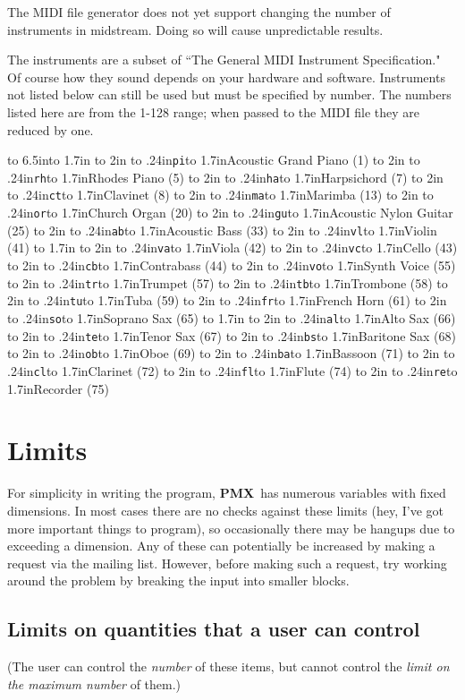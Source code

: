\documentclass[11pt]{article}
\newcommand\PMXX{\textbf{PMX}}
\newcommand\PMX{\PMXX~}
\begin{document}
The MIDI file generator does not yet support changing the number of 
instruments in midstream.  Doing so will cause unpredictable results.

      The instruments are a subset of ``The General MIDI Instrument 
Specification." Of course how they sound depends on your hardware and software. 
Instruments not listed below can still be used but must be specified by number.  
The numbers listed here are from the 1-128 range; when passed to the MIDI file 
they are reduced by one.

\def\tentry#1#2#3{\hbox to 2in{
\hbox to .24in{\tt #1\hfill}\hbox to 1.7in{#2 (#3)\hfill}\hss}} 

\null
\hbox to 6.5in{\vbox to 1.7in{
\tentry{pi}{Acoustic Grand Piano}{1}
\tentry{rh}{Rhodes Piano}{5}
\tentry{ha}{Harpsichord}{7}
\tentry{ct}{Clavinet}{8}
\tentry{ma}{Marimba}{13}
\tentry{or}{Church Organ}{20}
\tentry{gu}{Acoustic Nylon Guitar}{25}
\tentry{ab}{Acoustic Bass}{33}
\tentry{vl}{Violin}{41}
}\hss\vbox to 1.7in{
\tentry{va}{Viola}{42}
\tentry{vc}{Cello}{43}
\tentry{cb}{Contrabass}{44}
\tentry{vo}{Synth Voice}{55}
\tentry{tr}{Trumpet}{57}
\tentry{tb}{Trombone}{58}
\tentry{tu}{Tuba}{59}
\tentry{fr}{French Horn}{61}
\tentry{so}{Soprano Sax}{65}
}\hss\vbox to 1.7in{
\tentry{al}{Alto Sax}{66}
\tentry{te}{Tenor Sax}{67}
\tentry{bs}{Baritone Sax}{68}
\tentry{ob}{Oboe}{69}
\tentry{ba}{Bassoon}{71}
\tentry{cl}{Clarinet}{72}
\tentry{fl}{Flute}{74}
\tentry{re}{Recorder}{75}
}}

\section{Limits}

For simplicity in writing the program, \PMX has numerous variables with
fixed dimensions.  In most cases there are no checks against these limits
(hey, I've got more important things to program), so
occasionally there may be hangups due to exceeding a dimension.  
Any of these can potentially be increased by making a request via the 
mailing list.  However, before making such a
request, try working around the problem by 
breaking the input into smaller blocks.  

\subsection{Limits on quantities that a user can control}  

(The user can control the {\it number} of these items, but cannot control
the {\it limit on the maximum number} of them.)
\end{document}
